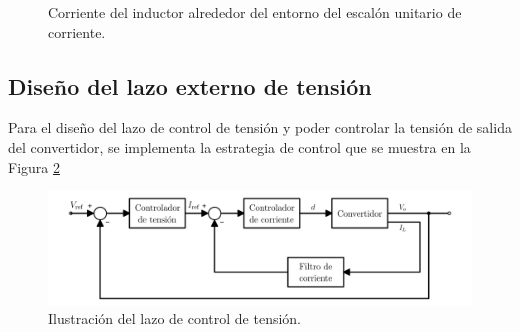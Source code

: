 \begin{figure}[hbt!]
  \centering
  \hspace{3.5mm}
  \hspace{3.5mm}
  \caption{Corriente del inductor alrededor del entorno del escalón unitario de corriente.}
  \label{formas-onda-filtradas-lazo-corriente}
\end{figure}

\subsection{Diseño del lazo externo de tensión}

Para el diseño del lazo de control de tensión y poder controlar la tensión de salida del convertidor, se implementa la estrategia de control que se muestra en la Figura \ref{lazo-tension}

\begin{figure}[hbt!]
  \centering
  \includegraphics[width=0.80\columnwidth]{Imágenes/Diseño del control/Lazo de control de tensión.pdf}
  \caption{Ilustración del lazo de control de tensión.}
  \label{lazo-tension}
\end{figure} 

